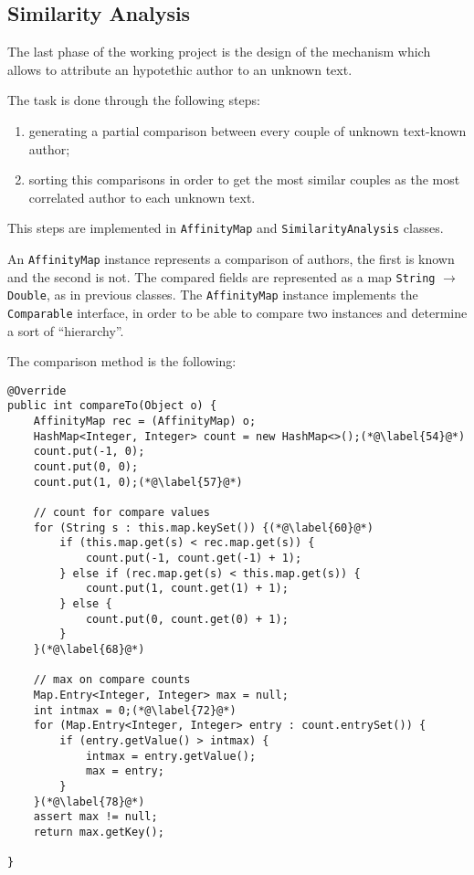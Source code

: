 \documentclass[a4paper,11pt, twoside]{article}
\begin{document}
	\subsection{Similarity Analysis}
	The last phase of the working project is the design of the mechanism which allows to attribute an hypotethic author to an unknown text.
	
	The task is done through the following steps: \begin{enumerate}
		\item generating a partial comparison between every couple of unknown text-known author;
		\item sorting this comparisons in order to get the most similar couples as the most correlated author to each unknown text.
	\end{enumerate}

	This steps are implemented in \lstinline|AffinityMap| and \lstinline|SimilarityAnalysis| classes.
	
	 An \lstinline|AffinityMap| instance represents a comparison of authors, the first is known and the second is not. The compared fields are represented as a map \lstinline|String| $\to$ \lstinline|Double|, as in previous classes. The \lstinline|AffinityMap| instance implements the \lstinline|Comparable| interface, in order to be able to compare two instances and determine a sort of ``hierarchy''.
	 
	 The comparison method is the following:\begin{lstlisting}[firstnumber=51,caption={AffinityMap comparison method}, captionpos=b, label={lst:comparemethod}]
@Override
public int compareTo(Object o) {
	AffinityMap rec = (AffinityMap) o;
	HashMap<Integer, Integer> count = new HashMap<>();(*@\label{54}@*)
	count.put(-1, 0);
	count.put(0, 0);
	count.put(1, 0);(*@\label{57}@*)
	
	// count for compare values
	for (String s : this.map.keySet()) {(*@\label{60}@*)
		if (this.map.get(s) < rec.map.get(s)) {
			count.put(-1, count.get(-1) + 1);
		} else if (rec.map.get(s) < this.map.get(s)) {
			count.put(1, count.get(1) + 1);
		} else {
			count.put(0, count.get(0) + 1);
		}
	}(*@\label{68}@*)
	
	// max on compare counts
	Map.Entry<Integer, Integer> max = null;
	int intmax = 0;(*@\label{72}@*)
	for (Map.Entry<Integer, Integer> entry : count.entrySet()) {
		if (entry.getValue() > intmax) {
			intmax = entry.getValue();
			max = entry;
		}
	}(*@\label{78}@*)
	assert max != null;
	return max.getKey();

}
	 \end{lstlisting}
	 
\end{document}
